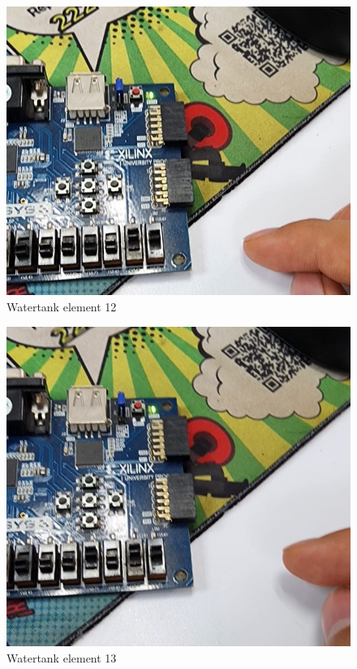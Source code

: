 \documentclass{article}
\begin{document}
\begin{multicols}{2}
	\begin{figure}[H]
		\centering
		\includegraphics[width=1\linewidth]{images/diagrams/watertank/watertank12.jpg}
		\caption{Watertank element 12}
		\label{Watertank element 12 Apendix}
	\end{figure}

	\begin{figure}[H]
		\centering
		\includegraphics[width=1\linewidth]{images/diagrams/watertank/watertank13.jpg}
		\caption{Watertank element 13}
		\label{Watertank element 13 Apendix}
	\end{figure}


\end{multicols}
\end{document}

